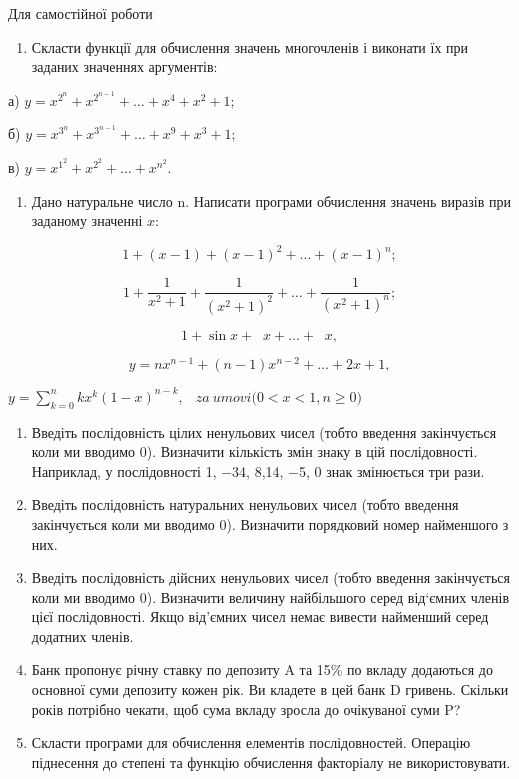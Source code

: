 \documentclass[]{article}
\begin{document}
Для самостійної роботи

\begin{enumerate}
\def\labelenumi{\arabic{enumi})}
\item
  Скласти функції для обчислення значень многочленів і виконати їх при
  заданих значеннях аргументів:
\end{enumerate}

а) \(y = x^{2^{n}} + x^{2^{n - 1}} + \ldots + x^{4} + x^{2} + 1;\)

б) \(y = x^{3^{n}} + x^{3^{n - 1}} + \ldots + x^{9} + x^{3} + 1;\)

в) \(y = x^{1^{2}} + x^{2^{2}} + \ldots + x^{n^{2}}.\)

\begin{enumerate}
\def\labelenumi{\arabic{enumi})}
\item
  Дано натуральне число \(\text{n.\ }\)Написати програми обчислення
  значень виразів при заданому значенні \(x\):
\end{enumerate}

\[1 + (x - 1) + (x - 1)^{2} + \ldots + (x - 1)^{n};\]

\[1 + \frac{1}{x^{2} + 1} + \frac{1}{(x^{2} + 1)^{2}} + \ldots + \frac{1}{(x^{2} + 1)^{n}};\]

\[1 + \sin x + \operatorname{}x + \ldots + \operatorname{}x,\]

\[y = nx^{n - 1} + (n - 1)x^{n - 2} + \ldots + 2x + 1,\]

\(y = \sum_{k = 0}^{n}{kx^{k}(1 - x)^{n - k}},\mathrm{\ }\mathrm{\ }\)
\(za\ umovi\mathrm{(}0 < x < 1,n \geq 0)\)

\begin{enumerate}
\def\labelenumi{\arabic{enumi})}
\item
  Введіть послідовність цілих ненульових чисел (тобто введення
  закінчується коли ми вводимо 0). Визначити кількість змін знаку в цій
  послідовності. Наприклад, у послідовності 1, −34, 8,14, −5, 0 знак
  змінюється три рази.
\item
  Введіть послідовність натуральних ненульових чисел (тобто введення
  закінчується коли ми вводимо 0). Визначити порядковий номер найменшого
  з них.
\item
  Введіть послідовність дійсних ненульових чисел (тобто введення
  закінчується коли ми вводимо 0). Визначити величину найбільшого серед
  від`ємних членів цієї послідовності. Якщо від'ємних чисел немає
  вивести найменший серед додатних членів.
\item
  Банк пропонує річну ставку по депозиту A та 15\% по вкладу додаються
  до основної суми депозиту кожен рік. Ви кладете в цей банк D гривень.
  Скільки років потрібно чекати, щоб сума вкладу зросла до очікуваної
  суми P?
\item
  Скласти програми для обчислення елементів послідовностей. Операцію
  піднесення до степені та функцію обчислення факторіалу не
  використовувати.
\end{enumerate}
\end{document}
